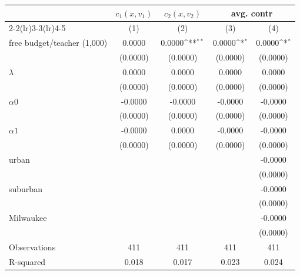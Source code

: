 {
\def\sym#1{\ifmmode^{#1}\else\(^{#1}\)\fi}
\begin{tabular}{l*{4}{c}}
\hline\hline
                    &\multicolumn{1}{c}{$ c_{1}(x,v_{1})$}&\multicolumn{1}{c}{$ c_{2}(x,v_{2})$}&\multicolumn{2}{c}{avg. contr}             \\\cmidrule(lr){2-2}\cmidrule(lr){3-3}\cmidrule(lr){4-5}
                    &\multicolumn{1}{c}{(1)}         &\multicolumn{1}{c}{(2)}         &\multicolumn{1}{c}{(3)}         &\multicolumn{1}{c}{(4)}         \\
\hline
free budget/teacher (1,000)&      0.0000         &      0.0000\sym{**} &      0.0000\sym{*}  &      0.0000\sym{*}  \\
                    &    (0.0000)         &    (0.0000)         &    (0.0000)         &    (0.0000)         \\
[1em]
$\lambda$           &      0.0000         &      0.0000         &      0.0000         &      0.0000         \\
                    &    (0.0000)         &    (0.0000)         &    (0.0000)         &    (0.0000)         \\
[1em]
$\alpha0$           &     -0.0000         &     -0.0000         &     -0.0000         &     -0.0000         \\
                    &    (0.0000)         &    (0.0000)         &    (0.0000)         &    (0.0000)         \\
[1em]
$\alpha1$           &     -0.0000         &      0.0000         &     -0.0000         &     -0.0000         \\
                    &    (0.0000)         &    (0.0000)         &    (0.0000)         &    (0.0000)         \\
[1em]
urban               &                     &                     &                     &     -0.0000         \\
                    &                     &                     &                     &    (0.0000)         \\
[1em]
suburban            &                     &                     &                     &     -0.0000         \\
                    &                     &                     &                     &    (0.0000)         \\
[1em]
Milwaukee           &                     &                     &                     &     -0.0000         \\
                    &                     &                     &                     &    (0.0000)         \\
\hline
Observations        &         411         &         411         &         411         &         411         \\
R-squared           &       0.018         &       0.017         &       0.023         &       0.024         \\
\hline\hline
\end{tabular}
}
